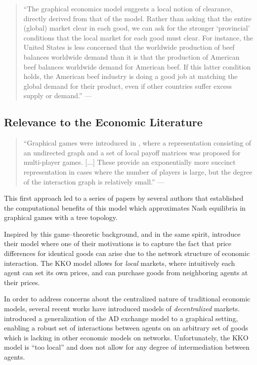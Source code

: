 \documentclass[cm,linguex]{glossa}
\theoremstyle{defn}
\theoremstyle{axiom}
\theoremstyle{thm}
\theoremstyle{lem}
\theoremstyle{cor}
\theoremstyle{prop}
\theoremstyle{rmk}
\begin{document}
\begin{quote}
``The graphical economics model suggests a local notion of clearance,
directly derived from that of the \citet{AD} model. Rather than asking
that the entire (global) market clear in each good, we can ask for the
stronger `provincial' conditions that the local market for each good
must clear. For instance, the United States is less concerned that the
worldwide production of beef balances worldwide demand than it is that
the production of American beef balances worldwide demand for American
beef. If this latter condition holds, the American beef industry is
doing a good job at matching the global demand for their product, even
if other countries suffer excess supply or demand.'' --- \citet{KKO}
\end{quote}

\hypertarget{relevance-to-the-economic-literature}{%
\subsection{Relevance to the Economic
Literature}\label{relevance-to-the-economic-literature}}

\begin{quote}
``Graphical games were introduced in \citet{Kearns}, where a
representation consisting of an undirected graph and a set of local
payoff matrices was proposed for multi-player games. {[}\(\dots\){]}
These provide an exponentially more succinct representation in cases
where the number of players is large, but the degree of the interaction
graph is relatively small.'' --- \citet{KKO}
\end{quote}

This first approach led to a series of papers by several authors that
established the computational benefits of this model which approximates
Nash equilibria in graphical games with a tree topology.

Inspired by this game--theoretic background, and in the same spirit,
\citet{KKO} introduce their model where one of their motivations is to
capture the fact that price differences for identical goods can arise
due to the network structure of economic interaction. The KKO model
allows for \emph{local} markets, where intuitively each agent can set
its own prices, and can purchase goods from neighboring agents at their
prices.

In order to address concerns about the centralized nature of traditional
economic models, several recent works have introduced models of
\emph{decentralized} markets. \citet{KKO} introduced a generalization of
the AD exchange model to a graphical setting, enabling a robust set of
interactions between agents on an arbitrary set of goods which is
lacking in other economic models on networks. Unfortunately, the KKO
model is ``too local'' and does not allow for any degree of
intermediation between agents.
\end{document}
